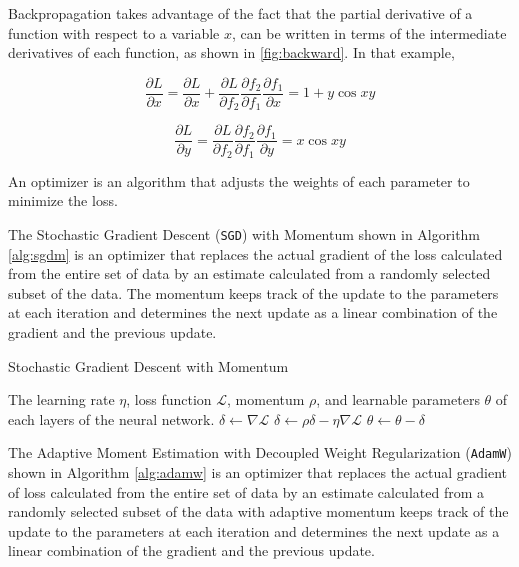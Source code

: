 Backpropagation takes advantage of the fact that the partial derivative of a function with respect to a variable $x$, can be written in terms of the intermediate derivatives of each function, as shown in \ref{fig:backward}. In that example, 

\begin{equation}
    \frac{\partial L}{\partial x} = \frac{\partial L}{\partial x} + \frac{\partial L}{\partial f_2} \frac{\partial f_2}{\partial f_1} \frac{\partial f_1}{\partial x} = 1 + y\cos{xy}
\end{equation}

\begin{equation}
    \frac{\partial L}{\partial y} =\frac{\partial L}{\partial f_2} \frac{\partial f_2}{\partial f_1} \frac{\partial f_1}{\partial y} = x\cos{xy}
\end{equation}

An optimizer is an algorithm that adjusts the weights of each parameter to minimize the loss.

The Stochastic Gradient Descent (\verb|SGD|) with Momentum shown in Algorithm \ref{alg:sgdm} is an optimizer that replaces the actual gradient of the loss calculated from the entire set of data by an estimate calculated from a randomly selected subset of the data. The momentum keeps track of the update to the parameters at each iteration and determines the next update as a linear combination of the gradient and the previous update.

\begin{algorithm}[htb]
\caption{Stochastic Gradient Descent with Momentum}
\label{alg:sgdm}
\begin{algorithmic}
    \Require The learning rate $\eta$, loss function $\mathcal{L}$, momentum $\rho$, and learnable parameters $\theta$ of each layers of the neural network.
    \State $\delta \gets \nabla \mathcal{L}$
            \State $\delta  \gets \rho \delta - \eta\nabla\mathcal{L}$ 
            \State $\theta \gets \theta - \delta $
        \EndFor
    \EndFunction{}
\end{algorithmic}
\end{algorithm}

The Adaptive Moment Estimation with Decoupled Weight Regularization (\verb|AdamW|) shown in Algorithm \ref{alg:adamw} is an optimizer that replaces the actual gradient of loss calculated from the entire set of data by an estimate calculated from a randomly selected subset of the data with adaptive momentum keeps track of the update to the parameters at each iteration and determines the next update as a linear combination of the gradient and the previous update.

